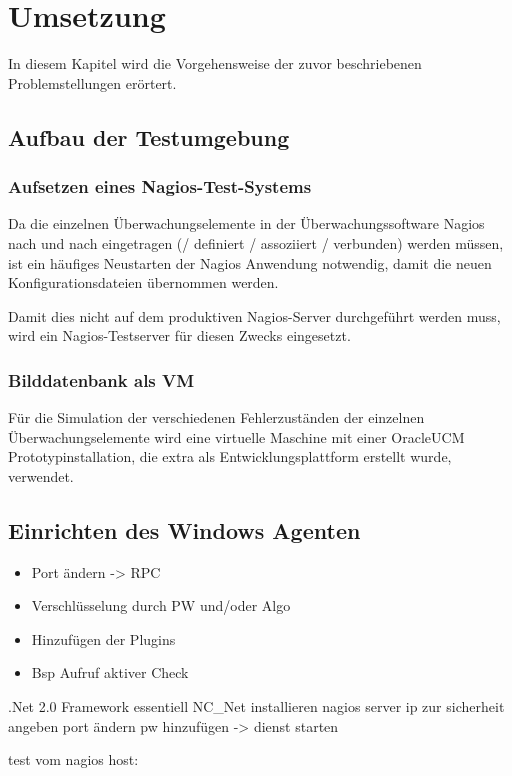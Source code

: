 \section{Umsetzung}
In diesem Kapitel wird die Vorgehensweise der zuvor beschriebenen Problemstellungen erörtert.

\subsection{Aufbau der Testumgebung}




\subsubsection{Aufsetzen eines Nagios-Test-Systems}
Da die einzelnen Überwachungselemente in der Überwachungssoftware Nagios nach und nach eingetragen (/ definiert / assoziiert / verbunden) werden müssen, ist ein häufiges Neustarten der Nagios Anwendung notwendig, damit die neuen Konfigurationsdateien übernommen werden.

Damit dies nicht auf dem produktiven Nagios-Server durchgeführt werden muss, wird ein Nagios-Testserver für diesen Zwecks eingesetzt.

\subsubsection{Bilddatenbank als VM}
Für die Simulation der verschiedenen Fehlerzuständen der einzelnen Überwachungselemente wird eine virtuelle Maschine mit einer \gls{OracleUCM} Prototypinstallation, die extra als Entwicklungsplattform erstellt wurde, verwendet.


\subsection{Einrichten des Windows Agenten}
\begin{itemize}
\item Port ändern -> RPC
\item Verschlüsselung durch PW und/oder Algo
\item Hinzufügen der Plugins
\item Bsp Aufruf aktiver Check
\end{itemize}

.Net 2.0 Framework essentiell
NC\_Net installieren
nagios server ip zur sicherheit angeben
port ändern
pw hinzufügen
-> dienst starten

test vom nagios host:

